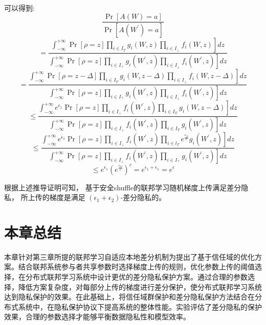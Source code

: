可以得到:
$$
\frac{\operatorname{Pr}[A(W)=a]}{\operatorname{Pr}\left[A\left(W^{\prime}\right)=a\right]}$$
$$=\frac{ \left.\int_{-\infty}^{+\infty} \operatorname{Pr}[\rho=z] \prod_{i \in I_{T}} g_{i}(W, z) \prod_{i \in I_{\perp}} f_{i}(W, z)\right] d z}{ \left.\int_{-\infty}^{+\infty} \operatorname{Pr}[\rho=z] \prod_{i \in I_{\top}} g_{i}\left(W^{\prime}, z\right) \prod_{i \in I_{\perp}} f_{i}\left(W^{\prime}, z\right)\right] d z}$$
$$=\frac{ \left.\int_{-\infty}^{+\infty} \operatorname{Pr}[\rho=z-\Delta] \prod_{i \in I_{T}} g_{i}(W, z-\Delta) \prod_{i \in I_{\perp}} f_{i}(W, z-\Delta)\right] d z}{ \left.\int_{-\infty}^{+\infty} \operatorname{Pr}[\rho=z] \prod_{i \in I_{\top}} g_{i}\left(W^{\prime}, z\right) \prod_{i \in I_{\perp}} f_{i}\left(W^{\prime}, z\right)\right] d z}$$
$$\leq \frac{ \left.\int_{-\infty}^{+\infty} e^{\epsilon_{1}} \operatorname{Pr}[\rho=z] \prod_{i \in I_{\perp}} f_{i}\left(W^{\prime}, z\right) \prod_{i \in I_{\mathrm{T}}} g_{i}(W, z-\Delta)\right] d z}{ \left.\int_{-\infty}^{+\infty} \operatorname{Pr}[\rho=z] \prod_{i \in I_{\perp}} f_{i}\left(W^{\prime}, z\right) \prod_{i \in I_{T}} g_{i}\left(W^{\prime}, z\right)\right] d z}$$
$$\leq \frac{ \left.\int_{-\infty}^{+\infty} e^{\epsilon_{1}} \operatorname{Pr}[\rho=z] \prod_{i \in I_{\perp}} f_{i}\left(W^{\prime}, z\right) \prod_{i \in l_{T}} e^{\frac{\epsilon_{\Omega}}{c}} g_{i}\left(W^{\prime}, z\right)\right] d z}{ \left.\int_{-\infty}^{+\infty} \operatorname{Pr}[\rho=z] \prod_{i \in I_{\perp}} f_{i}\left(W^{\prime}, z\right) \prod_{i \in I_{\top}} g_{i}\left(W^{\prime}, z\right)\right] d z}$$
$$\leq e^{\epsilon_{1}}\left(e^{\frac{\epsilon_{\Omega}}{c}}\right)^{c}=e^{\epsilon_{1}+\epsilon_{1}}=e^{\epsilon}$$

根据上述推导证明可知， 基于安全shuffle的联邦学习随机梯度上传满足差分隐私， 所上传的梯度是满足 $\left(\epsilon_{1}+\epsilon_{2}\right)$-差分隐私的。

\section{本章总结}
本章针对第三章所提的联邦学习自适应本地差分机制为提出了基于信任域的优化方案。结合联邦系统参与者共享参数时选择梯度上传的规则，优化参数上传的阈值选择，在分布式联邦学习系统中设计更优的差分隐私保护方案。通过合理的参数选择，降低方案复杂度，对每部分上传的梯度进行差分保护，使分布式联邦学习系统达到隐私保护的效果。在此基础上，将信任域群保护和差分隐私保护方法结合在分布式系统中，在隐私保护协议下提高系统的整体性能。实验评估了差分隐私的保护效果，合理的参数选择才能够平衡数据隐私性和模型效率。




























